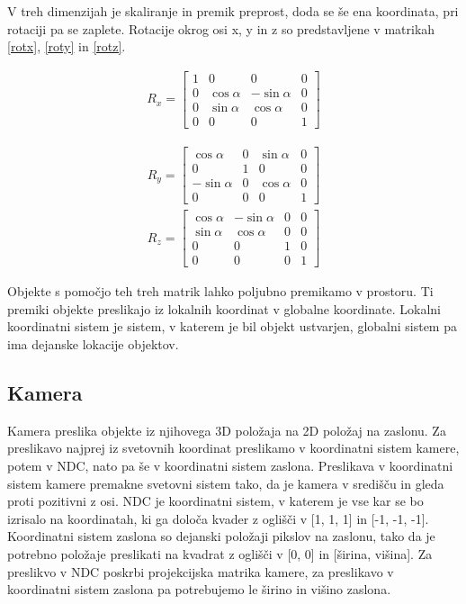 \documentclass[a4paper, 12pt]{book}
\begin{document}
V treh dimenzijah je skaliranje in premik preprost, doda se še ena koordinata, pri rotaciji pa se zaplete. Rotacije okrog osi x, y in z so predstavljene v matrikah \ref{rotx}, \ref{roty} in \ref{rotz}.

\begin{align}
R_x
=
\begin{bmatrix}
1 & 0 & 0 & 0 \\
0 & \cos\alpha & -\sin\alpha & 0 \\
0 & \sin\alpha & \cos\alpha & 0 \\
0 & 0 & 0 & 1
\end{bmatrix}
\label{rotx}
\end{align}

\begin{align}
R_y
=
\begin{bmatrix}
\cos\alpha & 0 & \sin\alpha & 0 \\
0 & 1 & 0 & 0 \\
-\sin\alpha & 0 & \cos\alpha & 0 \\
0 & 0 & 0 & 1
\end{bmatrix}
\label{roty}
\end{align}
\begin{align}
R_z
=
\begin{bmatrix}
\cos\alpha & -\sin\alpha & 0 & 0 \\
\sin\alpha & \cos\alpha & 0 & 0 \\
0 & 0 & 1 & 0 \\
0 & 0 & 0 & 1
\end{bmatrix}
\label{rotz}
\end{align}

Objekte s pomočjo teh treh matrik lahko poljubno premikamo v prostoru. Ti premiki objekte preslikajo iz lokalnih koordinat v globalne koordinate. Lokalni koordinatni sistem je sistem, v katerem je bil objekt ustvarjen, globalni sistem pa ima dejanske lokacije objektov.


\subsection*{Kamera}

Kamera preslika objekte iz njihovega 3D položaja na 2D položaj na zaslonu. Za preslikavo najprej iz svetovnih koordinat preslikamo v koordinatni sistem kamere, potem v NDC, nato pa še v koordinatni sistem zaslona. Preslikava v koordinatni sistem kamere premakne svetovni sistem tako, da je kamera v središču in gleda proti pozitivni z osi. NDC je koordinatni sistem, v katerem je vse kar se bo izrisalo na koordinatah, ki ga določa kvader z oglišči v [1, 1, 1] in [-1, -1, -1]. Koordinatni sistem zaslona so dejanski položaji pikslov na zaslonu, tako da je potrebno položaje preslikati na kvadrat z oglišči v [0, 0] in [širina, višina]. Za preslikvo v NDC poskrbi projekcijska matrika kamere, za preslikavo v koordinatni sistem zaslona pa potrebujemo le širino in višino zaslona.
\end{document}
